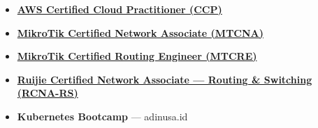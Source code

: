 \begin{itemize}
  \item \href{https://www.credly.com/badges/f6343257-05ea-47ec-ba96-c2eaa7996bf1}{\textbf{AWS Certified Cloud Practitioner (CCP)}}
  \item \href{https://mikrotik.com/training/certificates/c718167cdeb7ed58514a}{\textbf{MikroTik Certified Network Associate (MTCNA)}}
  \item \href{https://mikrotik.com/training/certificates/c721407cc714d0352754}{\textbf{MikroTik Certified Routing Engineer (MTCRE)}}
  \item \href{https://www.linkedin.com/in/eric-julianto/overlay/Certifications/1216277271/treasury/?profileId=ACoAAFSJB6ABj2umTaBp_Y5x3AKPJfZPPteGLpE}{\textbf{Ruijie Certified Network Associate --- Routing \& Switching (RCNA-RS)}}
  \item \textbf{Kubernetes Bootcamp} --- adinusa.id
\end{itemize}
